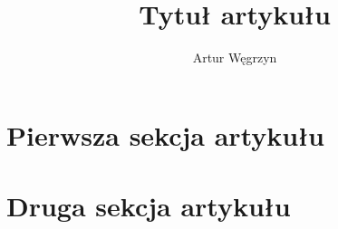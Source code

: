 \documentclass[12pt]{article}
\begin{document}
\title{Tytuł artykułu}
\author{Artur Węgrzyn}
\maketitle

\tableofcontents

\section{Pierwsza sekcja artykułu}
\section{Druga sekcja artykułu}
\end{document}
